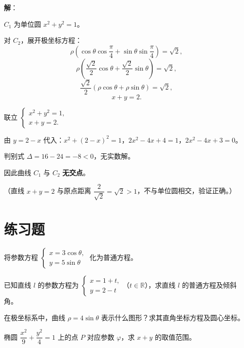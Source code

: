 \documentclass[12pt,a4paper]{ctexart}
\theoremstyle{definition}
\begin{document}
\textbf{解}：

$C_1$ 为单位圆 $x^2+y^2=1$。

对 $C_2$，展开极坐标方程：
\[
  \rho\left(\cos\theta\cos\frac{\pi}{4}+\sin\theta\sin\frac{\pi}{4}\right) = \sqrt{2},
\]
\[
  \rho\left(\frac{\sqrt{2}}{2}\cos\theta + \frac{\sqrt{2}}{2}\sin\theta\right) = \sqrt{2},
\]
\[
  \frac{\sqrt{2}}{2}(\rho\cos\theta + \rho\sin\theta) = \sqrt{2},
\]
\[
  x + y = 2.
\]

联立 $\begin{cases} x^2+y^2=1, \\ x+y=2. \end{cases}$

由 $y=2-x$ 代入：$x^2+(2-x)^2=1$，$2x^2-4x+4=1$，$2x^2-4x+3=0$。

判别式 $\Delta = 16-24 = -8 < 0$，无实数解。

因此曲线 $C_1$ 与 $C_2$ \textbf{无交点}。

（直线 $x+y=2$ 与原点距离 $\dfrac{2}{\sqrt{2}}=\sqrt{2}>1$，不与单位圆相交，验证正确。）

\newpage

\section{练习题}

\begin{practice}[\textsf{练习1}]
  将参数方程 $\begin{cases} x = 3\cos\theta, \\ y = 5\sin\theta \end{cases}$ 化为普通方程。
\end{practice}

\begin{practice}[\textsf{练习2}]
  已知直线 $l$ 的参数方程为 $\begin{cases} x = 1 + t, \\ y = 2 - t \end{cases}$（$t\in\mathbb{R}$），求直线 $l$ 的普通方程及倾斜角。
\end{practice}

\begin{practice}[\textsf{练习3}]
  在极坐标系中，曲线 $\rho = 4\sin\theta$ 表示什么图形？求其直角坐标方程及圆心坐标。
\end{practice}

\begin{practice}[\textsf{练习4}]
  椭圆 $\dfrac{x^2}{9}+\dfrac{y^2}{4}=1$ 上的点 $P$ 对应参数 $\varphi$，求 $x+y$ 的取值范围。
\end{practice}
\end{document}
